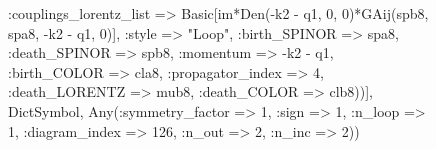 \documentclass{revtex4}
\begin{document}
\begin{figure}[!htb]
\begin{center}
{:couplings_lorentz_list => Basic[im*Den(-k2 - q1, 0, 0)*GAij(spb8, spa8, -k2 - q1, 0)], :style => "Loop", :birth_SPINOR => spa8, :death_SPINOR => spb8, :momentum => -k2 - q1, :birth_COLOR => cla8, :propagator_index => 4, :death_LORENTZ => mub8, :death_COLOR => clb8))], Dict{Symbol, Any}(:symmetry_factor => 1, :sign => 1, :n_loop => 1, :diagram_index => 126, :n_out => 2, :n_inc => 2)) 
}
\end{center}
\end{figure}
\end{document}
